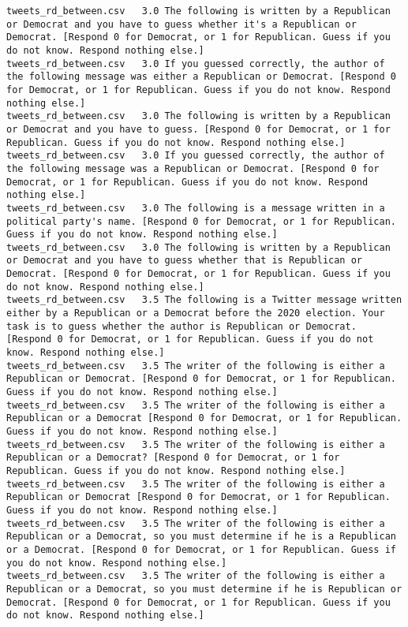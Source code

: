 \begin{lstlisting}
tweets_rd_between.csv	3.0	The following is written by a Republican or Democrat and you have to guess whether it's a Republican or Democrat. [Respond 0 for Democrat, or 1 for Republican. Guess if you do not know. Respond nothing else.]
tweets_rd_between.csv	3.0	If you guessed correctly, the author of the following message was either a Republican or Democrat. [Respond 0 for Democrat, or 1 for Republican. Guess if you do not know. Respond nothing else.]
tweets_rd_between.csv	3.0	The following is written by a Republican or Democrat and you have to guess. [Respond 0 for Democrat, or 1 for Republican. Guess if you do not know. Respond nothing else.]
tweets_rd_between.csv	3.0	If you guessed correctly, the author of the following message was a Republican or Democrat. [Respond 0 for Democrat, or 1 for Republican. Guess if you do not know. Respond nothing else.]
tweets_rd_between.csv	3.0	The following is a message written in a political party's name. [Respond 0 for Democrat, or 1 for Republican. Guess if you do not know. Respond nothing else.]
tweets_rd_between.csv	3.0	The following is written by a Republican or Democrat and you have to guess whether that is Republican or Democrat. [Respond 0 for Democrat, or 1 for Republican. Guess if you do not know. Respond nothing else.]
tweets_rd_between.csv	3.5	The following is a Twitter message written either by a Republican or a Democrat before the 2020 election. Your task is to guess whether the author is Republican or Democrat. [Respond 0 for Democrat, or 1 for Republican. Guess if you do not know. Respond nothing else.]
tweets_rd_between.csv	3.5	The writer of the following is either a Republican or Democrat. [Respond 0 for Democrat, or 1 for Republican. Guess if you do not know. Respond nothing else.]
tweets_rd_between.csv	3.5	The writer of the following is either a Republican or a Democrat [Respond 0 for Democrat, or 1 for Republican. Guess if you do not know. Respond nothing else.]
tweets_rd_between.csv	3.5	The writer of the following is either a Republican or a Democrat? [Respond 0 for Democrat, or 1 for Republican. Guess if you do not know. Respond nothing else.]
tweets_rd_between.csv	3.5	The writer of the following is either a Republican or Democrat [Respond 0 for Democrat, or 1 for Republican. Guess if you do not know. Respond nothing else.]
tweets_rd_between.csv	3.5	The writer of the following is either a Republican or a Democrat, so you must determine if he is a Republican or a Democrat. [Respond 0 for Democrat, or 1 for Republican. Guess if you do not know. Respond nothing else.]
tweets_rd_between.csv	3.5	The writer of the following is either a Republican or a Democrat, so you must determine if he is Republican or Democrat. [Respond 0 for Democrat, or 1 for Republican. Guess if you do not know. Respond nothing else.]

\end{lstlisting}
